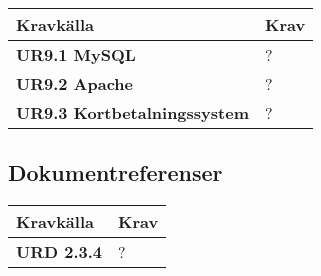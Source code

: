 \documentclass[a4paper, twoside, 11pt, titlepage]{article}
\begin{document}
	\begin {table} [ht] \begin{tabular} {  p{5.5cm} p{9.6cm} }
		\hline
		\sffamily\textbf{Kravkälla} & \sffamily\textbf{Krav } \\
		\hline
		\sffamily\textbf{UR9.1 MySQL} & ?  \\
		\hline
		\sffamily\textbf{UR9.2 Apache} & ?  \\
		\hline
		\sffamily\textbf{UR9.3 Kortbetalningssystem} & ?  \\
		\hline
	\end{tabular} \end{table} \FloatBarrier


	\subsection{Dokumentreferenser}


	\begin {table} [ht] \begin{tabular} {  p{5.5cm} p{9.6cm} }
		\hline
		\sffamily\textbf{Kravkälla} & \sffamily\textbf{Krav } \\
		\hline
		\sffamily\textbf{URD 2.3.4} & ?  \\
		\hline
	\end{tabular} \end{table} \FloatBarrier


\clearpage
	\appendix
\end{document}
